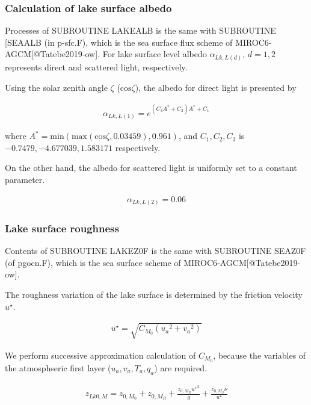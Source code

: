 \hypertarget{calculation-of-lake-surface-albedo}{%
\subsubsection{Calculation of lake surface albedo}\label{calculation-of-lake-surface-albedo}}

Processes of SUBROUTINE LAKEALB is the same with SUBROUTINE {[}SEAALB (in p-sfc.F), which is the sea surface flux scheme of MIROC6-AGCM{[}@Tatebe2019-ow{]}. For lake surface level albedo
\(\alpha_{Lk,L(d)}\), \(d=1,2\) represents direct and scattered light, respectively.

Using the solar zenith angle \(\zeta\) (\(\mathrm{cos}\zeta\)), the albedo for direct light is presented by

\begin{eqnarray}
    \alpha_{Lk,L(1)} = e^{(C_3A^\ast + C_2) A^\ast +C_1}
\end{eqnarray}

where \(A^\ast = \mathrm{min}(\mathrm{max}(\mathrm{cos}\zeta,0.03459),0.961)\), and \(C_1, C_2, C_3\) is \(-0.7479, -4.677039, 1.583171\) respectively.

On the other hand, the albedo for scattered light is uniformly set to a constant parameter.

\begin{eqnarray}
    \alpha_{Lk,L(2)} = 0.06
\end{eqnarray}

\hypertarget{lake-surface-roughness}{%
\subsubsection{Lake surface roughness}\label{lake-surface-roughness}}

Contents of SUBROUTINE LAKEZ0F is the same with SUBROUTINE SEAZ0F (of pgocn.F), which is the sea surface scheme of MIROC6-AGCM{[}@Tatebe2019-ow{]}.

The roughness variation of the lake surface is determined by the friction velocity \(u^\star\).

\begin{eqnarray}
u^{\star} = \sqrt{C_{M_0} ({u_a}^2  +{v_a}^2)}
\end{eqnarray}

We perform successive approximation calculation of \({C_{M_0}}\), because the variables of the atmosphseric first layer (\(u_a,v_a,T_a,q_a\)) are required.

\begin{eqnarray}
    z_{Lk0,M} = z_{0,M_0} + z_{0,M_R} + \frac{z_{0,M_R} {u^\star }^2 }{g} + \frac{z_{0,M_S}\nu }{u^\star}
\end{eqnarray}

